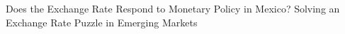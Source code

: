 Does the Exchange Rate Respond to Monetary Policy in Mexico? Solving an Exchange Rate Puzzle in Emerging Markets